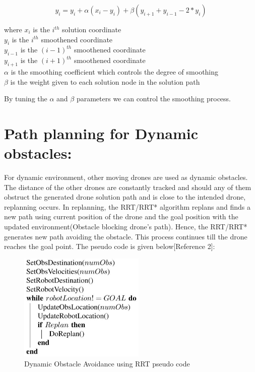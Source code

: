 \documentclass{IEEEtran}
\begin{document}
\begin{enumerate}
\boldmath	
\begin{equation}
y_i = y_i + \alpha(x_i - y_i) + \beta(y_{i+1} + y_{i-1} - 2*y_i)
\end{equation}
\unboldmath
\begin{center}
where $x_i$ is the $i^{th}$ solution coordinate \\
        $y_i$ is the  $i^{th}$ smoothened coordinate \\
	$y_{i-1}$ is the  $(i-1)^{th}$ smoothened coordinate \\
	$y_{i+1}$ is the  $(i+1)^{th}$ smoothened coordinate \\
	$\alpha$ is the smoothing coefficient which controls the degree of smoothing \\
	$\beta$ is the weight given to each solution node in the solution path \\
\end{center}
By tuning the $\alpha$ and $\beta$ parameters we can control the smoothing process.
\end{enumerate}
\section{ \textbf{Path planning for Dynamic obstacles:}}
For dynamic environment, other moving drones are used as dynamic obstacles.
The distance of the other drones are constantly tracked and should any of them 
obstruct the generated drone solution path
 and is close to the intended drone, replanning occurs.
 In replanning, the RRT/RRT* algorithm replans and finds a new path using current position of 
 the drone and the goal position with the updated environment(Obstacle blocking drone's path).
 Hence, the RRT/RRT* generates new path avoiding the obstacle. This process continues till the drone reaches the goal point. The pseudo code is given below[Reference 2]:
\begin{figure}[h]
    \centering
    \includegraphics[width=6cm]{dynpseudocode}
    \caption{Dynamic Obstacle Avoidance using RRT pseudo code}
    \label{fig:Dynamic Obstacle Avoidance using RRT pseudo code}
\end{figure}
\end{document}

